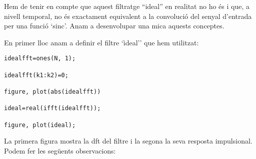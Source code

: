 \documentclass{article}
\begin{document}
Hem de tenir en compte que aquest filtratge ``ideal'' en realitat no ho és i que, a nivell temporal, no és exactament equivalent a la
convolució del senyal d'entrada per una funció `sinc'. Anam a desenvolupar una mica aquests conceptes.

En primer lloc anam a definir el filtre `ìdeal'' que hem utilitzat:

\begin{verbatim}
idealfft=ones(N, 1); 

idealfft(k1:k2)=0;

figure, plot(abs(idealfft))

ideal=real(ifft(idealfft));

figure, plot(ideal);
\end{verbatim}

La primera figura mostra la dft del filtre i la segona la seva resposta impulsional.
Podem fer les següents observacions:
\end{document}
